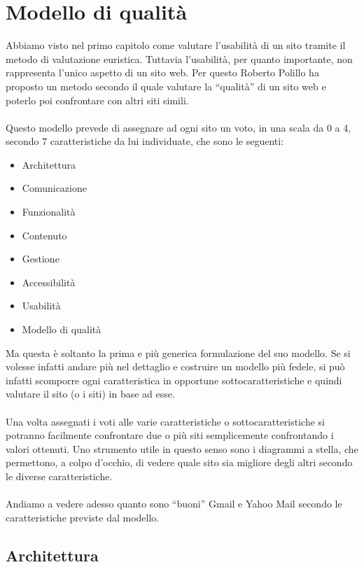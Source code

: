 \chapter{Modello di qualit\`{a}} \label{chap:modello_qualità}

	Abbiamo visto nel primo capitolo come valutare l'usabilità di un sito tramite il metodo di valutazione euristica. Tuttavia  l'usabilità, per quanto importante, non rappresenta l'unico aspetto di un sito web. Per questo Roberto Polillo ha proposto un metodo secondo il quale valutare la ``qualità'' di un sito web e poterlo poi confrontare con altri siti simili.\\
	\\
	Questo modello prevede di assegnare ad ogni sito un voto, in una scala da 0 a 4, secondo 7 caratteristiche da lui  individuate, che sono le seguenti:
	\begin{itemize}
		\item Architettura
		\item Comunicazione
		\item Funzionalità
		\item Contenuto
		\item Gestione
		\item Accessibilità
		\item Usabilità
		\item Modello di qualità
	\end{itemize}
	Ma questa è soltanto la prima e più generica formulazione del suo modello. Se si volesse infatti andare più nel dettaglio e costruire un modello più fedele, si può infatti scomporre ogni caratteristica in opportune sottocaratteristiche e quindi valutare il sito (o i siti) in base ad esse.\\
	\\
	Una volta assegnati i voti alle varie caratteristiche o sottocaratteristiche si potranno facilmente confrontare due o più siti semplicemente confrontando i valori ottenuti. Uno strumento utile in questo senso sono i diagrammi a stella, che permettono, a colpo d'occhio, di vedere quale sito sia migliore degli altri secondo le diverse caratteristiche.\\
	\\
	Andiamo a vedere adesso quanto sono ``buoni'' Gmail e Yahoo Mail secondo le caratteristiche previste dal modello.

	\section{Architettura} \label{sec:architettura}
	
